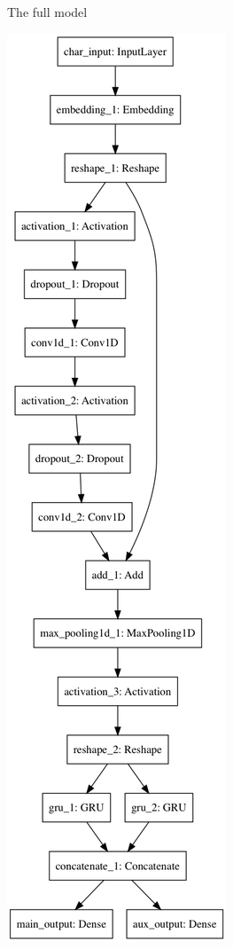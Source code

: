 \begin{figure}[H]
\begin{subfigure}[b]{0.3\textwidth}
        \caption{The full model}
        \label{fig:model_full}
    \end{subfigure}
    \begin{subfigure}[b]{0.3\textwidth}
        \includegraphics[width=\textwidth]{pictures/model_chars.png}

\end{subfigure}
\end{figure}

